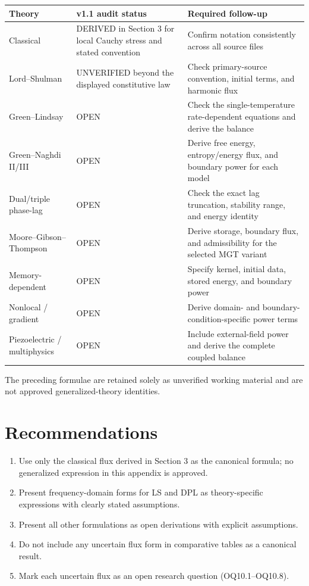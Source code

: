 \begin{table}[htbp]
\centering
\small
\begin{tabularx}{\textwidth}{@{}p{2.6cm}XX@{}}
\toprule
\textbf{Theory} & \textbf{v1.1 audit status} & \textbf{Required follow-up} \\
\midrule
Classical & DERIVED in Section 3 for local Cauchy stress and stated convention & Confirm notation consistently across all source files \\
Lord--Shulman & UNVERIFIED beyond the displayed constitutive law & Check primary-source convention, initial terms, and harmonic flux \\
Green--Lindsay & OPEN & Check the single-temperature rate-dependent equations and derive the balance \\
Green--Naghdi II/III & OPEN & Derive free energy, entropy/energy flux, and boundary power for each model \\
Dual/triple phase-lag & OPEN & Check the exact lag truncation, stability range, and energy identity \\
Moore--Gibson--Thompson & OPEN & Derive storage, boundary flux, and admissibility for the selected MGT variant \\
Memory-dependent & OPEN & Specify kernel, initial data, stored energy, and boundary power \\
Nonlocal / gradient & OPEN & Derive domain- and boundary-condition-specific power terms \\
Piezoelectric / multiphysics & OPEN & Include external-field power and derive the complete coupled balance \\
\bottomrule
\end{tabularx}
\end{table}

The preceding formulae are retained solely as unverified working material and are not approved generalized-theory identities.

\section{Recommendations}

\begin{enumerate}
\item Use only the classical flux derived in Section 3 as the canonical formula; no generalized expression in this appendix is approved.
\item Present frequency-domain forms for LS and DPL as theory-specific expressions with clearly stated assumptions.
\item Present all other formulations as open derivations with explicit assumptions.
\item Do not include any uncertain flux form in comparative tables as a canonical result.
\item Mark each uncertain flux as an open research question (OQ10.1--OQ10.8).
\end{enumerate}

